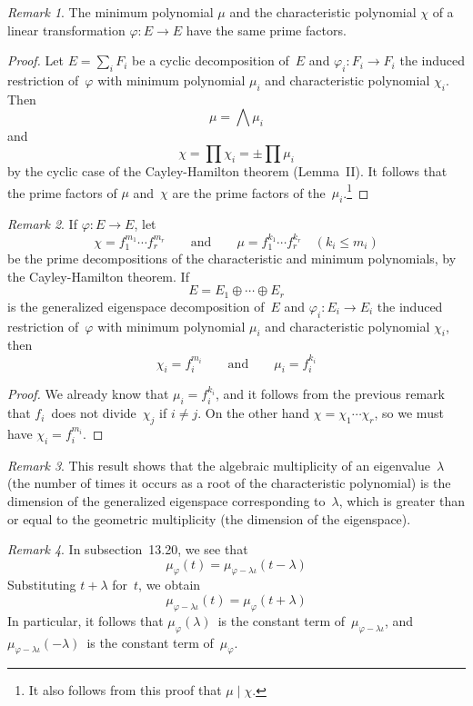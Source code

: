 \documentclass[letterpaper,12pt]{article}
\newcommand{\divides}{\mid}
\newcommand{\bigmeet}{\bigwedge}
\newcommand{\dsum}{\oplus}
\theoremstyle{definition}
\theoremstyle{remark}
\newtheorem*{rmk}{Remark}
\begin{document}
\begin{rmk}
The minimum polynomial \(\mu\) and the characteristic polynomial \(\chi\) of a linear transformation \(\varphi:E\to E\) have the same prime factors.
\end{rmk}
\begin{proof}
Let \(E=\sum_i F_i\) be a cyclic decomposition of~\(E\) and \(\varphi_i:F_i\to F_i\) the induced restriction of~\(\varphi\) with minimum polynomial \(\mu_i\) and characteristic polynomial \(\chi_i\). Then
\[\mu=\bigmeet\mu_i\]
and
\[\chi=\prod\chi_i=\pm\prod\mu_i\]
by the cyclic case of the Cayley-Hamilton theorem (Lemma~II). It follows that the prime factors of \(\mu\) and~\(\chi\) are the prime factors of the~\(\mu_i\).\footnote{It also follows from this proof that \(\mu\divides\chi\).}
\end{proof}

\begin{rmk}
If \(\varphi:E\to E\), let
\[\chi=f_1^{m_1}\cdots f_r^{m_r}\qquad\text{and}\qquad\mu=f_1^{k_1}\cdots f_r^{k_r}\quad(k_i\le m_i)\]
be the prime decompositions of the characteristic and minimum polynomials, by the Cayley-Hamilton theorem. If
\[E=E_1\dsum\cdots\dsum E_r\]
is the generalized eigenspace decomposition of~\(E\) and \(\varphi_i:E_i\to E_i\) the induced restriction of~\(\varphi\) with minimum polynomial \(\mu_i\) and characteristic polynomial \(\chi_i\), then
\[\chi_i=f_i^{m_i}\qquad\text{and}\qquad\mu_i=f_i^{k_i}\]
\end{rmk}
\begin{proof}
We already know that \(\mu_i=f_i^{k_i}\), and it follows from the previous remark that \(f_i\)~does not divide~\(\chi_j\) if \(i\ne j\). On the other hand \(\chi=\chi_1\cdots\chi_r\), so we must have \(\chi_i=f_i^{m_i}\).
\end{proof}
\begin{rmk}
This result shows that the algebraic multiplicity of an eigenvalue~\(\lambda\) (the number of times it occurs as a root of the characteristic polynomial) is the dimension of the generalized eigenspace corresponding to~\(\lambda\), which is greater than or equal to the geometric multiplicity (the dimension of the eigenspace).
\end{rmk}

\begin{rmk}
In subsection~13.20, we see that
\[\mu_{\varphi}(t)=\mu_{\varphi-\lambda\iota}(t-\lambda)\]
Substituting \(t+\lambda\) for~\(t\), we obtain
\[\mu_{\varphi-\lambda\iota}(t)=\mu_{\varphi}(t+\lambda)\]
In particular, it follows that \(\mu_{\varphi}(\lambda)\)~is the constant term of~\(\mu_{\varphi-\lambda\iota}\), and \(\mu_{\varphi-\lambda\iota}(-\lambda)\)~is the constant term of~\(\mu_{\varphi}\).
\end{rmk}
\end{document}
